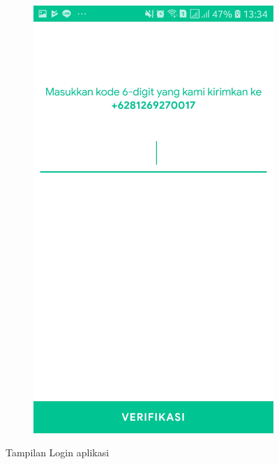 \begin{figure}[H]
\begin{subfigure}[b]{0.4\linewidth}
			\includegraphics [width = \linewidth]{gambar/android/verify}
		\end{subfigure}
		\caption{Tampilan Login aplikasi}
		\label{tampilanLoginPangkalan}
	\end{figure}

